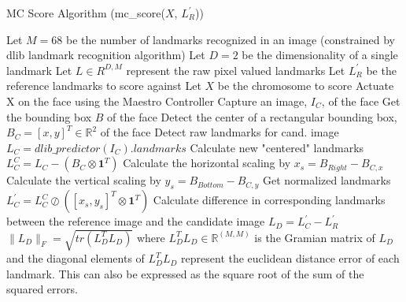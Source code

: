 \documentclass{article}
\begin{document}
\begin{algorithm}[H]
	\caption{MC Score Algorithm (mc\_score($X$, $L^\prime_R$))} 
	\begin{algorithmic}[1]
		\State Let $M = 68$ be the number of landmarks recognized in an image (constrained by dlib landmark recognition algorithm)
		\State Let $D = 2$ be the dimensionality of a single landmark
		\State Let $L \in R^{D, M}$ represent the raw pixel valued landmarks
		\State Let $L^\prime_R$ be the reference landmarks to score against
		\State Let $X$ be the chromosome to score
		\State Actuate X on the face using the Maestro Controller
		\State Capture an image, $I_C$, of the face
		\State Get the bounding box $B$ of the face
		\State Detect the center of a rectangular bounding box, $B_C = [x, y]^T \in \mathbb{R}^2$ of the face
		\State Detect raw landmarks for cand. image $L_C = dlib\_predictor(I_C).landmarks$
		\State Calculate new "centered" landmarks $L^C_C = L_C - (B_C \otimes \mathbf{1}^T)$
		\State Calculate the horizontal scaling by $x_s = B_{Right} - B_{C, x}$
		\State Calculate the vertical scaling by $y_s = B_{Bottom} - B_{C, y}$
		\State Get normalized landmarks $L^\prime_C = L^C_C \oslash ([x_s, y_s]^T \otimes \mathbf{1}^T)$
		\State Calculate difference in corresponding landmarks between the reference image and the candidate image $L_D = L^\prime_C - L^\prime_R$
		\State \Return $\| L_D \|_F = \sqrt{tr(L^T_DL_D)}$ where $L^T_DL_D \in \mathbb{R}^{(M, M)}$ is the Gramian matrix of $L_D$ and the diagonal elements of $L^T_DL_D$ represent the euclidean distance error of each landmark.  This can also be expressed as the square root of the sum of the squared errors.
	\end{algorithmic}
\end{algorithm}
\end{document}
